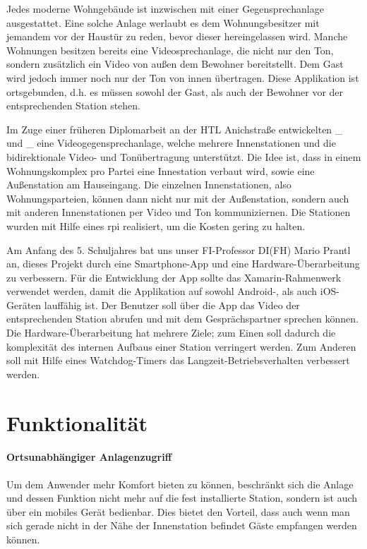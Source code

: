 Jedes moderne Wohngebäude ist inzwischen mit einer Gegensprechanlage ausgestattet.
Eine solche Anlage werlaubt es dem Wohnungsbesitzer mit jemandem vor der Haustür zu reden, bevor dieser hereingelassen wird.
Manche Wohnungen besitzen bereits eine Videosprechanlage, die nicht nur den Ton, sondern zusätzlich ein Video von außen dem Bewohner bereitstellt.
Dem Gast wird jedoch immer noch nur der Ton von innen übertragen.
Diese Applikation ist ortsgebunden, d.h. es müssen sowohl der Gast, als auch der Bewohner vor der entsprechenden Station stehen.\par

Im Zuge einer früheren Diplomarbeit an der HTL Anichstraße entwickelten \_ und \_ eine Videogegensprechanlage, welche mehrere Innenstationen und die bidirektionale Video- und Tonübertragung unterstützt.
Die Idee ist, dass in einem Wohnungskomplex pro Partei eine Innestation verbaut wird, sowie eine Außenstation am Hauseingang.
Die einzelnen Innenstationen, also Wohnungsparteien, können dann nicht nur mit der Außenstation, sondern auch mit anderen Innenstationen per Video und Ton kommuniziernen.
Die Stationen wurden mit Hilfe eines \ac{rpi} realisiert, um die Kosten gering zu halten.\par

Am Anfang des 5. Schuljahres bat uns unser FI-Professor DI(FH) Mario Prantl an, dieses Projekt durch eine Smartphone-App und eine Hardware-Überarbeitung zu verbessern.
Für die Entwicklung der App sollte das Xamarin-Rahmenwerk verwendet werden, damit die Applikation auf sowohl Android-, als auch iOS-Geräten lauffähig ist. Der Benutzer soll über die App das Video der entsprechenden Station abrufen und mit dem Gesprächspartner sprechen können.
Die Hardware-Überarbeitung hat mehrere Ziele; zum Einen soll dadurch die komplexität des internen Aufbaus einer Station verringert werden.
Zum Anderen soll mit Hilfe eines Watchdog-Timers das Langzeit-Betriebsverhalten verbessert werden.

\section{Funktionalität}
\paragraph{Ortsunabhängiger Anlagenzugriff}
Um dem Anwender mehr Komfort bieten zu können, beschränkt sich die Anlage und dessen Funktion nicht mehr auf die fest installierte Station, sondern ist auch über ein mobiles Gerät bedienbar.
Dies bietet den Vorteil, dass auch wenn man sich gerade nicht in der Nähe der Innenstation befindet Gäste empfangen werden können.

